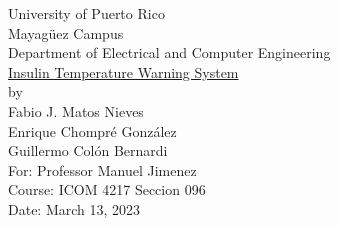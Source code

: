 \begin{titlepage}
  \begin{center}
    \large{University of Puerto Rico\\
    Mayagüez Campus\\
    \vspace{\baselineskip}
    Department of Electrical and Computer Engineering\\}
    \vspace{6cm}
    \Huge{\underline{Insulin Temperature Warning System}\\}
    \vspace{0.5\baselineskip}
    \large by\\
    Fabio J. Matos Nieves\\
    Enrique Chompré González\\
    Guillermo Colón Bernardi\\
    \vspace{4.5cm}
    For: Professor Manuel Jimenez\\
    Course: ICOM 4217 Seccion 096\\
    Date: March 13, 2023\\
    \normalsize

  \end{center}
\end{titlepage}
